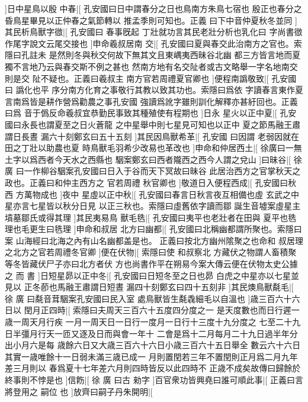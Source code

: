 ]日中星鳥以殷%
%
中春|[%
孔安國曰日中謂春分之日也鳥南方朱鳥七宿也%
殷正也春分之昏鳥星畢見以正仲春之氣節轉以%
%
推孟季則可知也。正義%
曰下中音仲夏秋冬並同%
]其民析鳥獸字㣲|[%
孔安國曰%
春事旣起%
%
丁壯就功言其民老壯分析也乳化曰%
字尚書㣲作尾字說文云尾交接也%
]申命羲叔居南%
%
交|[%
孔安國曰夏與春交此治南方之官也。索隱曰孔註未%
是然則冬與秋交何故下無其文且東嵎夷西昧谷北幽%
%
都三方皆言地而夏獨不言地乃云與春交斯不例之甚也%
然南方地有名交阯者或古文略舉一字名地南交則是交%
%
阯不疑也。正義曰羲叔主%
南方官若周禮夏官卿也%
]便程南譌敬致|[%
孔安國曰%
譌化也平%
%
序分南方化育之事敬行其教以致其功也。索隱曰爲依%
字讀春言東作夏言南爲皆是耕作營爲勸農之事孔安國%
%
強讀爲訛字雖則訓化解釋亦甚紆回也。正義曰爲%
音于僞反命羲叔宜恭勤民事致其種殖使有程期也%
]日永%
%
星火以正中夏|[%
孔安國曰永長也謂夏至之日火蒼龍%
之中星舉中則七星見可知也以正中%
%
夏之節馬融王肅謂日長晝%
漏六十刻鄭玄曰五十五刻%
]其民因鳥獸希革|[%
孔安國%
曰因謂%
%
老弱因就在田之丁壯以助農也夏%
時鳥獸毛羽希少改易也革改也%
]申命和仲居西土|[%
%
徐廣曰一無土字以爲西者今天水之西縣也%
駰案鄭玄曰西者隴西之西今人謂之兌山%
]曰昧谷|[%
徐%
廣%
%
曰一作柳谷駰案孔安國曰日入于谷而天下冥故曰昧谷%
此居治西方之官掌秋天之政也。正義曰和仲主西方之%
%
官若周禮%
秋官卿也%
]敬道日入便程西成|[%
孔安國曰秋西%
方萬物成也%
]夜中%
%
星虛以正中秋|[%
孔安國曰春言日秋言夜互相備也虛%
玄武之中星亦言七星皆以秋分日見%
%
以正三秋也。索隱曰虛舊依字讀而鄒%
誕生音墟案虛星主墳墓鄒氏或得其理%
]其民夷易鳥%
%
獸毛毨|[%
孔安國曰夷平也老壯者在田與%
夏平也毨理也毛更生曰毨理%
]申命和叔居%
%
北方曰幽都|[%
孔安國曰北稱幽都謂所聚也。索隱曰案%
山海經曰北海之內有山名幽都盖是也。%
%
正義曰按北方幽州隂聚之也命和%
叔居理之北方之官若周禮冬官卿%
]便在伏物|[%
索隱曰使%
和叔察北%
%
方藏伏之物謂人畜積聚等冬皆藏伏尸子亦曰北方者伏%
方也尚書作平在朔易今案大傳云便在伏物太史公據之%
%
而%
書%
]日短星昴以正中冬|[%
孔安國曰日短冬至之日也昴%
白虎之中星亦以七星並見以%
%
正冬莭也馬融王肅謂日短晝%
漏四十刻鄭玄曰四十五刻非%
]其民燠鳥獸氄毛|[%
徐%
廣%
%
曰氄音茸駰案孔安國曰民入室%
處鳥獸皆生氄毳細毛以自溫也%
]歳三百六十六日以%
%
閏月正四時|[%
索隱曰夫周天三百六十五度四分度之一%
是天度數也而日行遲一歳一周天月行疾%
%
一月一周天日一日行一度月一日行十三度十九分度之%
七至二十九日半彊月行天一匝又逐及日而與會一年十%
%
二會是爲十二月每月二十九日過半年分出小月六是每%
歳餘六日又大歳三百六十六日小歳三百六十五日舉全%
%
數云六十六日其實一歳唯餘十一日弱未滿三歳已成一%
月則置閏若三年不置閏則正月爲二月九年差三月則以%
%
春爲夏十七年差六月則四時皆反以此四時不%
正歳不成矣故傳曰歸餘於終事則不悖是也%
]信飭|[%
徐%
廣%
%
曰古%
勑字%
]百官衆功皆興堯曰誰可順此事|[%
正義曰言%
將登用之%
%
嗣位%
也%
]放齊曰嗣子丹朱開明|[%

